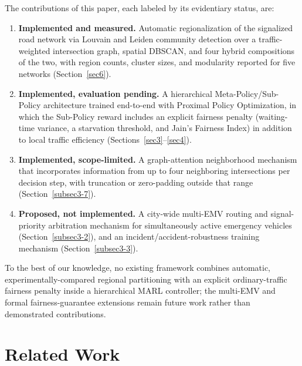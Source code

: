 \documentclass[3p,times]{elsarticle}
\theoremstyle{plain}
\theoremstyle{definition}
\begin{document}
The contributions of this paper, each labeled by its evidentiary
status, are:
\begin{enumerate}
\item \textbf{Implemented and measured.} Automatic regionalization of
the signalized road network via Louvain and Leiden community detection
over a traffic-weighted intersection graph, spatial DBSCAN, and four
hybrid compositions of the two, with region counts, cluster sizes, and
modularity reported for five networks (Section~\ref{sec6}).
\item \textbf{Implemented, evaluation pending.} A hierarchical
Meta-Policy/Sub-Policy architecture trained end-to-end with Proximal
Policy Optimization, in which the Sub-Policy reward includes an
explicit fairness penalty (waiting-time variance, a starvation
threshold, and Jain's Fairness Index) in addition to local traffic
efficiency (Sections~\ref{sec3}--\ref{sec4}).
\item \textbf{Implemented, scope-limited.} A graph-attention
neighborhood mechanism that incorporates information from up to four
neighboring intersections per decision step, with truncation or
zero-padding outside that range (Section~\ref{subsec3-7}).
\item \textbf{Proposed, not implemented.} A city-wide multi-EMV
routing and signal-priority arbitration mechanism for simultaneously
active emergency vehicles (Section~\ref{subsec3-2}), and an
incident/accident-robustness training mechanism (Section~\ref{subsec3-3}).
\end{enumerate}
To the best of our knowledge, no existing framework combines automatic,
experimentally-compared regional partitioning with an explicit
ordinary-traffic fairness penalty inside a hierarchical MARL
controller; the multi-EMV and formal fairness-guarantee extensions
remain future work rather than demonstrated contributions.



\section{Related Work}\label{sec2}
\end{document}
